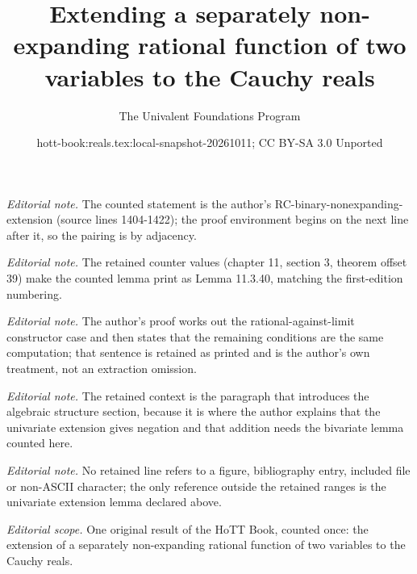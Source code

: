 \documentclass[10pt,a4paper]{article}
\title{Extending a separately non-expanding rational function of two variables to the Cauchy reals}
\author{The Univalent Foundations Program}
\date{hott-book:reals.tex:local-snapshot-20261011; CC BY-SA 3.0 Unported}
\newcounter{chapter}
\theoremstyle{definition}
\theoremstyle{remark}
\numberwithin{equation}{section}
\begin{document}
\maketitle
\setcounter{chapter}{11}
\setcounter{section}{3}
\setcounter{thm}{39}
\noindent\textit{Editorial note.} The counted statement is the author's RC-binary-nonexpanding-extension (source lines 1404-1422); the proof environment begins on the next line after it, so the pairing is by adjacency.\par\medskip
\noindent\textit{Editorial note.} The retained counter values (chapter 11, section 3, theorem offset 39) make the counted lemma print as Lemma 11.3.40, matching the first-edition numbering.\par\medskip
\noindent\textit{Editorial note.} The author's proof works out the rational-against-limit constructor case and then states that the remaining conditions are the same computation; that sentence is retained as printed and is the author's own treatment, not an extraction omission.\par\medskip
\noindent\textit{Editorial note.} The retained context is the paragraph that introduces the algebraic structure section, because it is where the author explains that the univariate extension gives negation and that addition needs the bivariate lemma counted here.\par\medskip
\noindent\textit{Editorial note.} No retained line refers to a figure, bibliography entry, included file or non-ASCII character; the only reference outside the retained ranges is the univariate extension lemma declared above.\par\medskip
\noindent\textit{Editorial scope.} One original result of the HoTT Book, counted once: the extension of a separately non-expanding rational function of two variables to the Cauchy reals.\par\medskip
\end{document}
